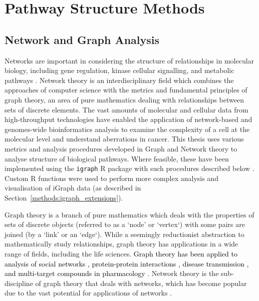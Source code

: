 \section{Pathway Structure Methods}

\subsection{Network and Graph Analysis}

Networks are important in considering the structure of relationships in molecular biology, including gene regulation, kinase cellular signalling, and metabolic \glspl{pathway} \citep{Barabasi2004}. Network theory is an interdisciplinary field which combines the approaches of computer science with the metrics and fundamental principles of graph theory, an area of pure mathematics dealing with relationships between sets of discrete elements. The vast amounts of molecular and cellular data from high-throughput technologies have enabled the application of network-based and \glspl{genome}-wide \gls{bioinformatics} analysis to examine the complexity of a cell at the molecular level and understand aberrations in cancer. This thesis uses various metrics and analysis procedures developed in Graph and Network theory to analyse  structure of biological \glspl{pathway}. Where feasible, these have been implemented using the \texttt{igraph} R package with such procedures described below \citep{igraph}. Custom R functions were used to perform more complex analysis and visualisation of iGraph data (as described in Section~\ref{methods:igraph_extensions}).

Graph theory is a branch of pure mathematics which deals with the properties of sets of discrete objects (referred to as a `node' or `vertex`) with some pairs are joined (by a `link' or an `edge`). While a seemingly reductionist abstraction to mathematically study relationships, graph theory has applications in a wide range of fields, including the life sciences. \textcolor{black}{Graph theory has been applied to analysis of social networks \citep{Milgram1967}, protein-protein interactions \citep{Kranthi2013}, disease transmission \citep{Barabasi2004}, and multi-target compounds in pharmacology \citep{Hopkins2008}.} Network theory is the sub-discipline of graph theory that deals with networks, which has become popular due to the vast potential for applications of networks \citep{vanSteen2010}.


